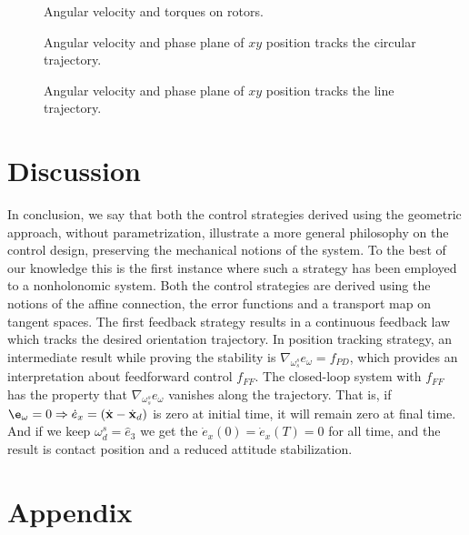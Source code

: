 \documentclass{ifacconf}
\begin{document}
\begin{figure}[h]
\centering
\caption{Angular velocity and torques on rotors.}				
\label{fig:5}
\end{figure}
\begin{figure}[h]
\centering
\caption{Angular velocity and phase plane of $xy$ position tracks the circular trajectory.}			
\label{fig:6}
\end{figure}
\begin{figure}[h]
\centering
\caption{Angular velocity and phase plane of $xy$ position tracks the line trajectory.}			
\label{fig:7}
\end{figure}
\section{Discussion}
In conclusion, we say that both the control strategies derived using the geometric approach, without parametrization,  illustrate a more general philosophy on the control design, preserving the mechanical notions of the system. To the best of our knowledge this is the first instance where such a strategy has been employed to a nonholonomic system. Both the control  strategies are derived using the notions of the affine connection, the error functions and a transport map on tangent spaces. The first feedback strategy results in a continuous feedback law which tracks the desired orientation trajectory. In position tracking strategy, an intermediate result while proving the stability is $\nabla_{\omega_{s}^{s}}e_{\omega} = f_{PD}$, which provides an interpretation about feedforward control $f_{FF}$. The closed-loop system with $f_{FF}$ has the property that $\nabla_{\omega_{s}^{s}}e_{\omega}$ vanishes along the trajectory. That is, if $\e_{\omega} =0 \Rightarrow \dot{e}_{x}=(\dot{\mathbf{x}} - \dot{\mathbf{x}}_{d})$ is zero at initial time, it will remain zero at final time. And if we keep $\omega_{d}^{s}=\hat{e}_{3}$ we get the $\dot{e}_{x}(0)=\dot{e}_{x}(T)=0$ for all time, and the result is contact position and a reduced attitude stabilization. 
\section*{Appendix}
\end{document}
